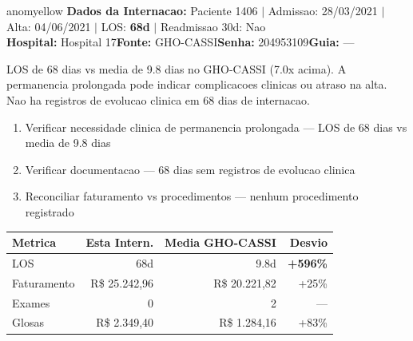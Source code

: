 \documentclass[a4paper,10pt]{article}
\begin{document}
\newpage

\begin{anomalycard}[Internacao 1196 | GHO-CASSI | MODERADO (z=2.01)]{anomyellow}
\textbf{Dados da Internacao:} Paciente 1406 $\mid$ Admissao: 28/03/2021 $\mid$ Alta: 04/06/2021 $\mid$ LOS: \textbf{68d} $\mid$ Readmissao 30d: Nao\\
\textbf{Hospital:} Hospital 17\quad\textbf{Fonte:} GHO-CASSI\quad\textbf{Senha:} 204953109\quad\textbf{Guia:} ---\\
\vspace{2pt}\begin{tcolorbox}[colback=severityred!20,colframe=anomyellow,title={\textbf{Interpretacao de Negocio}},fonttitle=\bfseries\small,left=4pt,right=4pt,top=3pt,bottom=3pt]
{\small LOS de 68 dias vs media de 9.8 dias no GHO-CASSI (7.0x acima). A permanencia prolongada pode indicar complicacoes clinicas ou atraso na alta. Nao ha registros de evolucao clinica em 68 dias de internacao.}
\end{tcolorbox}
\begin{tcolorbox}[colback=severityyellow!30,colframe=anomorange,title={\textbf{Recomendacoes Especificas}},fonttitle=\bfseries\small,left=4pt,right=4pt,top=3pt,bottom=3pt]
\begin{enumerate}[nosep,leftmargin=16pt]
\item {\small Verificar necessidade clinica de permanencia prolongada --- LOS de 68 dias vs media de 9.8 dias}
\item {\small Verificar documentacao --- 68 dias sem registros de evolucao clinica}
\item {\small Reconciliar faturamento vs procedimentos --- nenhum procedimento registrado}
\end{enumerate}
\end{tcolorbox}
\begin{center}\begin{tabular}{l r r r}\toprule\textbf{Metrica} & \textbf{Esta Intern.} & \textbf{Media GHO-CASSI} & \textbf{Desvio} \\\midrule
LOS & 68d & 9.8d & \textcolor{anomred}{\textbf{+596\%}} \\
Faturamento & R\$ 25.242,96 & R\$ 20.221,82 & +25\% \\
Exames & 0 & 2 & --- \\
Glosas & R\$ 2.349,40 & R\$ 1.284,16 & \textcolor{anomorange}{+83\%} \\
\bottomrule\end{tabular}\end{center}


\end{anomalycard}
\end{document}
